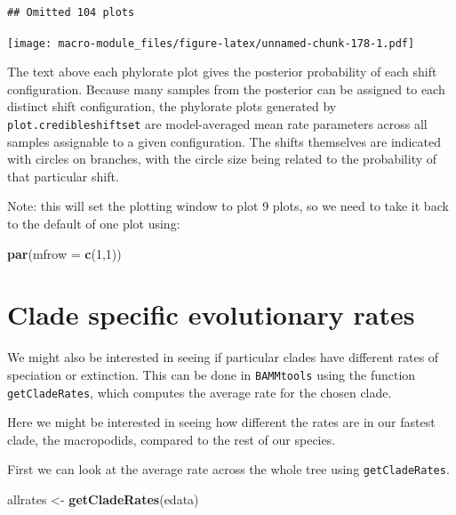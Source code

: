 \documentclass[]{book}
\newenvironment{Shaded}{\begin{snugshade}}{\end{snugshade}}
\newcommand{\KeywordTok}[1]{\textcolor[rgb]{0.13,0.29,0.53}{\textbf{{#1}}}}
\newcommand{\DataTypeTok}[1]{\textcolor[rgb]{0.13,0.29,0.53}{{#1}}}
\newcommand{\DecValTok}[1]{\textcolor[rgb]{0.00,0.00,0.81}{{#1}}}
\newcommand{\StringTok}[1]{\textcolor[rgb]{0.31,0.60,0.02}{{#1}}}
\newcommand{\NormalTok}[1]{{#1}}
\begin{document}
\begin{verbatim}
## Omitted 104 plots
\end{verbatim}

\texttt{[image: macro-module\_files/figure-latex/unnamed-chunk-178-1.pdf]}

The text above each phylorate plot gives the posterior probability of
each shift configuration. Because many samples from the posterior can be
assigned to each distinct shift configuration, the phylorate plots
generated by \texttt{plot.credibleshiftset} are model-averaged mean rate
parameters across all samples assignable to a given configuration. The
shifts themselves are indicated with circles on branches, with the
circle size being related to the probability of that particular shift.

Note: this will set the plotting window to plot 9 plots, so we need to
take it back to the default of one plot using:

\begin{Shaded}
\begin{Highlighting}[]
\KeywordTok{par}\NormalTok{(}\DataTypeTok{mfrow =} \KeywordTok{c}\NormalTok{(}\DecValTok{1}\NormalTok{,}\DecValTok{1}\NormalTok{))}
\end{Highlighting}
\end{Shaded}

\section{Clade specific evolutionary
rates}\label{clade-specific-evolutionary-rates}

We might also be interested in seeing if particular clades have
different rates of speciation or extinction. This can be done in
\texttt{BAMMtools} using the function \texttt{getCladeRates}, which
computes the average rate for the chosen clade.

Here we might be interested in seeing how different the rates are in our
fastest clade, the macropodids, compared to the rest of our species.

First we can look at the average rate across the whole tree using
\texttt{getCladeRates}.

\begin{Shaded}
\begin{Highlighting}[]
\NormalTok{allrates <-}\StringTok{ }\KeywordTok{getCladeRates}\NormalTok{(edata)}
\end{Highlighting}
\end{Shaded}
\end{document}

